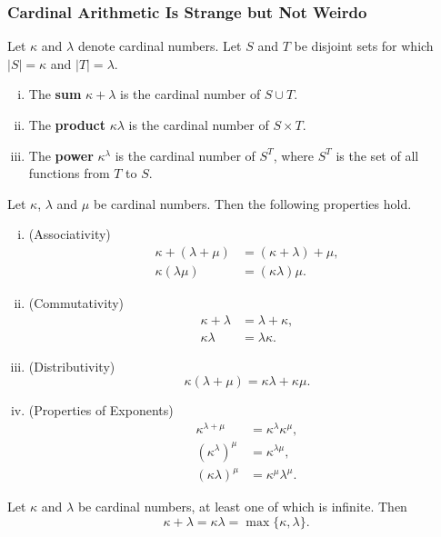 \subsubsection{Cardinal Arithmetic Is Strange but Not Weirdo}
\begin{definition}
	Let $\kappa$ and $\lambda$ denote cardinal numbers. Let $S$ and $T$ be disjoint sets for which $|S| = \kappa$ and $|T| = \lambda$. 
	\begin{enumerate}[(i)]
		\item The \textbf{sum} $\kappa + \lambda$ is the cardinal number of $S \cup T$.
		\item The \textbf{product} $\kappa\lambda$ is the cardinal number of $S \times T$.
		\item The \textbf{power} $\kappa^\lambda$ is the cardinal number of $S^T$, where $S^T$ is the set of all functions from $T$ to $S$.
	\end{enumerate}
\end{definition}
\begin{theorem}
	Let $\kappa$, $\lambda$ and $\mu$ be cardinal numbers. Then the following properties hold.
	\begin{enumerate}[(i)]
		\item (Associativity)
		\begin{align*}
			\kappa + (\lambda + \mu) &= (\kappa + \lambda) + \mu,
			\\
			\kappa(\lambda\mu) &= (\kappa\lambda)\mu.
		\end{align*}
		\item (Commutativity)
		\begin{align*}
			\kappa + \lambda &= \lambda + \kappa,
			\\
			 \kappa\lambda &= \lambda\kappa.
		\end{align*}
		\item (Distributivity)
		\[ \kappa(\lambda + \mu) = \kappa\lambda + \kappa\mu. \]
		\item (Properties of Exponents)
		\begin{align*}
			\kappa^{\lambda+\mu} &= \kappa^\lambda \kappa^\mu,
			\\
			(\kappa^\lambda)^\mu &= \kappa^{\lambda\mu},
			\\
			(\kappa\lambda)^\mu &= \kappa^\mu \lambda^\mu.
		\end{align*}
	\end{enumerate}
\end{theorem}

\begin{theorem} \label{thm-cardinal-sum-prod}
	Let $\kappa$ and $\lambda$ be cardinal numbers, at least one of which is infinite. Then
	\[ \kappa + \lambda = \kappa\lambda = \max\{\kappa, \lambda\}. \]
\end{theorem}








